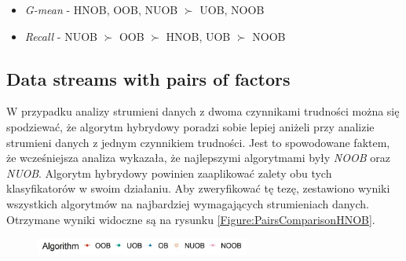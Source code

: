 \begin{itemize}
    \item \textit{G-mean} - HNOB, OOB, NUOB $\succ$ UOB, NOOB
    \item \textit{Recall} - NUOB $\succ$ OOB $\succ$ HNOB, UOB $\succ$ NOOB
\end{itemize}

\subsection{Data streams with pairs of factors}

\noindent W przypadku analizy strumieni danych z dwoma czynnikami trudności można się spodziewać, że algorytm hybrydowy poradzi sobie lepiej aniżeli przy analizie strumieni danych z jednym czynnikiem trudności. Jest to spowodowane faktem, że wcześniejsza analiza wykazała, że najlepszymi algorytmami były \textit{NOOB} oraz \textit{NUOB}. Algorytm hybrydowy powinien zaaplikować zalety obu tych klasyfikatorów w swoim działaniu. Aby zweryfikować tę tezę, zestawiono wyniki wszystkich algorytmów na najbardziej wymagających strumieniach danych. Otrzymane wyniki widoczne są na rysunku \ref{Figure:PairsComparisonHNOB}.

\newpage

\begin{figure}[h]
    \centering
    \includegraphics[width=7cm]{figures/algorithms_legend.JPG}
\end{figure}

\vspace{-1.2cm}

